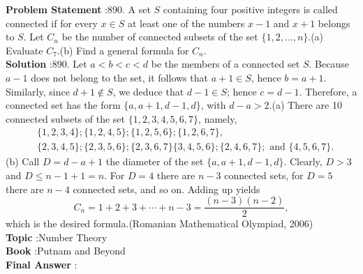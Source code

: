 \documentclass[10pt]{article}
\begin{document}
\textbf{Problem Statement} :890. A set $S$ containing four positive integers is called connected if for every $x \in S$ at least one of the numbers $x-1$ and $x+1$ belongs to $S$. Let $C_{n}$ be the number of connected subsets of the set $\{1,2, \ldots, n\}$.(a) Evaluate $C_{7}$.(b) Find a general formula for $C_{n}$.\\
\textbf{Solution} :890. Let $a<b<c<d$ be the members of a connected set $S$. Because $a-1$ does not belong to the set, it follows that $a+1 \in S$, hence $b=a+1$. Similarly, since $d+1 \notin S$, we deduce that $d-1 \in S$; hence $c=d-1$. Therefore, a connected set has the form $\{a, a+1, d-1, d\}$, with $d-a>2$.(a) There are 10 connected subsets of the set $\{1,2,3,4,5,6,7\}$, namely,$$ \begin{aligned} &\{1,2,3,4\} ;\{1,2,4,5\} ;\{1,2,5,6\} ;\{1,2,6,7\}, \\ &\{2,3,4,5\} ;\{2,3,5,6\} ;\{2,3,6,7\}\{3,4,5,6\} ;\{2,4,6,7\} ; \text { and }\{4,5,6,7\} . \end{aligned} $$(b) Call $D=d-a+1$ the diameter of the set $\{a, a+1, d-1, d\}$. Clearly, $D>3$ and $D \leq n-1+1=n$. For $D=4$ there are $n-3$ connected sets, for $D=5$ there are $n-4$ connected sets, and so on. Adding up yields$$ C_{n}=1+2+3+\cdots+n-3=\frac{(n-3)(n-2)}{2}, $$which is the desired formula.(Romanian Mathematical Olympiad, 2006)\\
\textbf{Topic} :Number Theory\\
\textbf{Book} :Putnam and Beyond\\
\textbf{Final Answer} :\\
\end{document}
